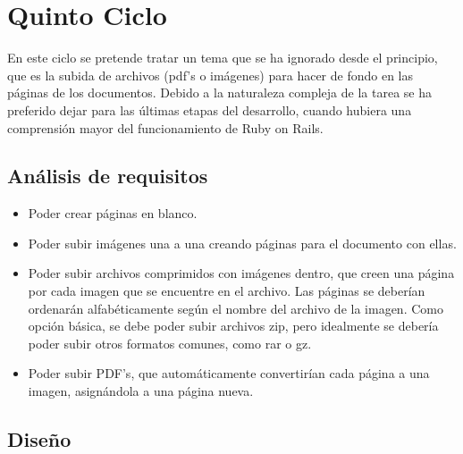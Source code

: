 \section{Quinto Ciclo} %
\label{sec:quinto_ciclo}

En este ciclo se pretende tratar un tema que se ha ignorado desde el principio, que es la subida de archivos (pdf's o imágenes) para hacer de fondo en las páginas de los documentos. Debido a la naturaleza compleja de la tarea se ha preferido dejar para las últimas etapas del desarrollo, cuando hubiera una comprensión mayor del funcionamiento de Ruby on Rails.

\subsection{Análisis de requisitos} %
\label{sub:análisis_de_requisitos}

\begin{itemize}
  \item Poder crear páginas en blanco.
  \item Poder subir imágenes una a una creando páginas para el documento con ellas.
  \item Poder subir archivos comprimidos con imágenes dentro, que creen una página por cada imagen que se encuentre en el archivo. Las páginas se deberían ordenarán alfabéticamente según el nombre del archivo de la imagen. Como opción básica, se debe poder subir archivos zip, pero idealmente se debería poder subir otros formatos comunes, como rar o gz.
  \item Poder subir PDF's, que automáticamente convertirían cada página a una imagen, asignándola a una página nueva.
\end{itemize}


\subsection{Diseño} %
\label{sub:diseño}

